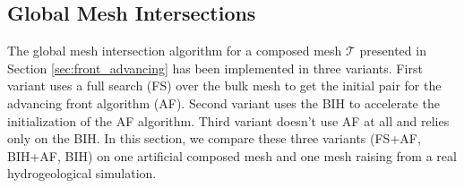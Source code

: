 % 
% 
% 

\subsection{Global Mesh Intersections}
The global mesh intersection algorithm for a composed mesh $\mathcal T$ presented in Section \ref{sec:front_advancing} has been
implemented in three variants. First variant uses a full search (FS) over the bulk mesh to get the initial pair for the advancing front algorithm (AF).
Second variant uses the BIH to accelerate the initialization of the AF algorithm. Third variant doesn't use AF at all and relies only on the BIH. 
In this section, we compare these three variants (FS+AF, BIH+AF, BIH) on one artificial composed mesh and one mesh raising from a real hydrogeological simulation.

